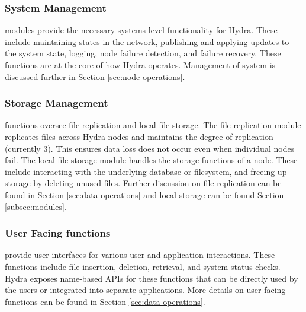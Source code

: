 \subsubsection{System Management} modules provide the necessary systems level functionality for Hydra. These include maintaining states in the network, publishing and applying updates to the system state, 
logging, node failure detection, and failure recovery. These functions are at the core of how Hydra operates. Management of system is discussed further in Section \ref{sec:node-operations}.

\subsubsection{Storage Management} functions oversee file replication and local file storage. The file replication module replicates files across Hydra nodes and maintains the degree of replication (currently 3). This ensures data loss does not occur even when individual nodes fail. The local file storage module handles the storage functions of a node. These include interacting with the underlying database or filesystem, and freeing up storage by deleting unused files.
Further discussion on file replication can be found in Section \ref{sec:data-operations} and local storage can be found Section \ref{subsec:modules}.

\subsubsection{User Facing functions} provide user interfaces for various user and application interactions. These functions include file insertion, deletion, retrieval, and system status checks. Hydra exposes name-based APIs for these functions that can be directly used by the users or integrated into separate applications. More details on user facing functions can be found in Section \ref{sec:data-operations}.